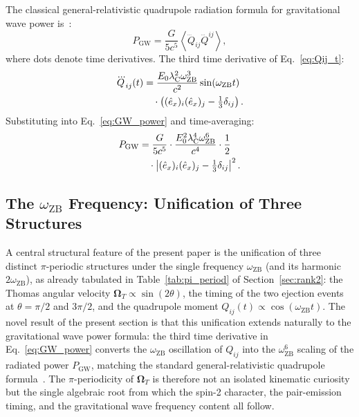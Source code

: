 \documentclass[%
 reprint, amsmath,amssymb, aps, prb, ]{revtex4-2}
\numberwithin{equation}{section}
\newcommand{\iphase}{\theta}
\newcommand{\omZB}{\omega_{\text{ZB}}}
\newcommand{\lambdaC}{\lambda_{\mathrm{C}}}
\newcommand{\OmT}{\boldsymbol{\Omega}_T}
\newcommand{\ehat}[1]{\hat{e}_{#1}}
\begin{document}
The classical general-relativistic quadrupole radiation formula for gravitational wave power is~\cite{Einstein1918,LandauLifshitz2,Maggiore2007}:
\begin{equation}
P_\mathrm{GW} = \frac{G}{5c^5}\left\langle\dddot{Q}_{ij}\dddot{Q}^{ij}\right\rangle,
\label{eq:GW_power}
\end{equation}
where dots denote time derivatives.
The third time derivative of Eq.~\eqref{eq:Qij_t}:
\begin{align}
\dddot{Q}_{ij}(t)
&= \frac{E_0\lambdaC^2\omZB^3}{c^2}\sin(\omZB t)
\notag\\
&\quad\cdot\left((\ehat{x})_i(\ehat{x})_j - \tfrac{1}{3}\delta_{ij}\right).
\label{eq:Qij_3dot}
\end{align}
Substituting into Eq.~\eqref{eq:GW_power} and time-averaging:
\begin{align}
P_\mathrm{GW}
&= \frac{G}{5c^5}
\cdot\frac{E_0^2\lambdaC^4\omZB^6}{c^4}
\cdot\frac{1}{2}
\notag\\
&\quad\cdot\left|(\ehat{x})_i(\ehat{x})_j - \tfrac{1}{3}\delta_{ij}\right|^2.
\label{eq:P_GW}
\end{align}

\subsection{\texorpdfstring{The $\omZB$ Frequency: Unification of Three Structures}{The omega_ZB Frequency: Unification of Three Structures}}

A central structural feature of the present paper is the unification of three distinct $\pi$-periodic structures under the single frequency $\omZB$ (and its harmonic $2\omZB$), as already tabulated in Table~\ref{tab:pi_period} of Section~\ref{sec:rank2}: the Thomas angular velocity $\OmT \propto \sin(2\iphase)$, the timing of the two ejection events at $\iphase = \pi/2$ and $3\pi/2$, and the quadrupole moment $Q_{ij}(t) \propto \cos(\omZB t)$.
The novel result of the present section is that this unification extends naturally to the gravitational wave power formula: the third time derivative in Eq.~\eqref{eq:GW_power} converts the $\omZB$ oscillation of $Q_{ij}$ into the $\omZB^6$ scaling of the radiated power $P_\mathrm{GW}$, matching the standard general-relativistic quadrupole formula~\cite{Maggiore2007}.
The $\pi$-periodicity of $\OmT$ is therefore not an isolated kinematic curiosity but the single algebraic root from which the spin-2 character, the pair-emission timing, and the gravitational wave frequency content all follow.
\end{document}
